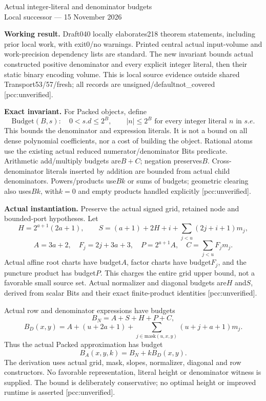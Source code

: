 \documentclass[10pt]{article}
\begin{document}
\begin{center}{\Large Actual integer-literal and denominator budgets}\\[4pt]
Local successor --- 15 November 2026\end{center}
\textbf{Working result.} Draft040 locally elaborates218 theorem statements,
including prior local work, with exit0/no warnings. Printed central actual
input-volume and work-precision dependency lists are standard. The new
invariant bounds actual constructed positive denominator and every explicit
integer literal, then their static binary encoding volume. This is local
source evidence outside shared Transport53/57/fresh; all records are
unsigned/defaultnot\_covered [pcc:unverified].

\textbf{Exact invariant.} For Packed object$s$, define
\[
 \mathrm{Budget}(B,s):\quad 0<s.d\le2^B,\qquad
 |n|\le2^B\text{ for every integer literal }n\text{ in }s.e.
\]
This bounds the denominator and expression literals. It is not a bound on
all dense polynomial coefficients, nor a cost of building the object.
Rational atoms use the existing actual reduced numerator/denominator Bits
predicate. Arithmetic add/multiply budgets are$B+C$; negation preserves$B$.
Cross-denominator literals inserted by addition are bounded from actual child
denominators. Powers/products use$Bk$ or sums of budgets; geometric clearing
also uses$Bk$, with$k=0$ and empty products handled explicitly
[pcc:unverified].

\textbf{Actual instantiation.} Preserve the actual signed grid, retained
node and bounded-port hypotheses. Let
\[
 H=2^{a+1}(2a+1),\qquad
 S=(a+1)+2H+i+\sum_{j<u}(2j+i+1)m_j,
\]
\[
 A=3a+2,\quad F_j=2j+3a+3,\quad P=2^{a+1}A,
 \quad C=\sum_{j<u}F_jm_j.
\]
Actual affine root charts have budget$A$, factor charts have budget$F_j$,
and the puncture product has budget$P$. This charges the entire grid upper
bound, not a favorable small source set. Actual normalizer and diagonal
budgets are$H$ and$S$, derived from scalar Bits and their exact finite-product
identities [pcc:unverified].

Actual row and denominator expressions have budgets
\[
 B_N=A+S+H+P+C,
\]
\[
 B_D(x,y)=A+(u+2a+1)
   +\sum_{j\in\mathrm{mask}(u,x,y)}(u+j+a+1)m_j.
\]
Thus the actual Packed approximation has budget
\[
 B_A(x,y,k)=B_N+kB_D(x,y).
\]
The derivation uses actual grid, mask, slopes, normalizer, diagonal and row
constructors. No favorable representation, literal height or denominator
witness is supplied. The bound is deliberately conservative; no optimal
height or improved runtime is asserted [pcc:unverified].
\end{document}
